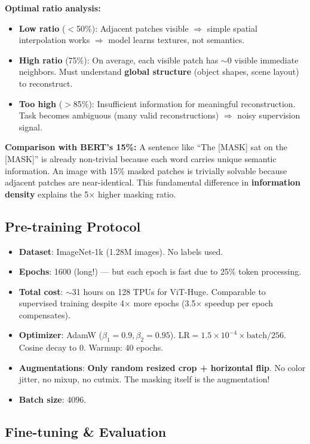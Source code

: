 \textbf{Optimal ratio analysis:}
\begin{itemize}
\item \textbf{Low ratio} ($<$50\%): Adjacent patches visible $\Rightarrow$ simple spatial interpolation works $\Rightarrow$ model learns textures, not semantics.
\item \textbf{High ratio} (75\%): On average, each visible patch has $\sim$0 visible immediate neighbors. Must understand \textbf{global structure} (object shapes, scene layout) to reconstruct.
\item \textbf{Too high} ($>$85\%): Insufficient information for meaningful reconstruction. Task becomes ambiguous (many valid reconstructions) $\Rightarrow$ noisy supervision signal.
\end{itemize}

\textbf{Comparison with BERT's 15\%:}
A sentence like ``The [MASK] sat on the [MASK]'' is already non-trivial because each word carries unique semantic information. An image with 15\% masked patches is trivially solvable because adjacent patches are near-identical. This fundamental difference in \textbf{information density} explains the 5$\times$ higher masking ratio.

\subsection{Pre-training Protocol}
\begin{itemize}
\item \textbf{Dataset}: ImageNet-1k (1.28M images). No labels used.
\item \textbf{Epochs}: 1600 (long!) — but each epoch is fast due to 25\% token processing.
\item \textbf{Total cost}: $\sim$31 hours on 128 TPUs for ViT-Huge. Comparable to supervised training despite 4$\times$ more epochs (3.5$\times$ speedup per epoch compensates).
\item \textbf{Optimizer}: AdamW ($\beta_1{=}0.9, \beta_2{=}0.95$). $\text{LR} = 1.5 \times 10^{-4} \times \text{batch}/256$. Cosine decay to 0. Warmup: 40 epochs.
\item \textbf{Augmentations}: \textbf{Only random resized crop + horizontal flip}. No color jitter, no mixup, no cutmix. The masking itself is the augmentation!
\item \textbf{Batch size}: 4096.
\end{itemize}

\subsection{Fine-tuning \& Evaluation}

